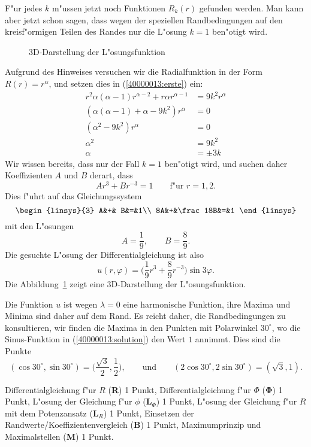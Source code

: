 \begin{loesung}
\begin{teilaufgaben}
F"ur jedes $k$ m"ussen jetzt noch Funktionen $R_k(r)$ gefunden werden.
Man kann aber jetzt schon sagen, dass wegen der speziellen Randbedingungen
auf den kreisf"ormigen Teilen des Randes nur die L"osung $k=1$ ben"otigt wird.

\begin{figure}
\centering
{}
\caption{3D-Darstellung der L"osungsfunktion
\label{40000013:3d}}
\end{figure}
Aufgrund des Hinweises versuchen wir die Radialfunktion in der Form
$R(r)=r^\alpha$, und setzen dies in (\ref{40000013:erste}) ein:
\begin{align*}
r^2\alpha(\alpha-1)r^{\alpha-2}+r\alpha r^{\alpha-1}&=9k^2r^{\alpha}
\\
(\alpha(\alpha-1)+\alpha -9k^2)r^{\alpha}&=0
\\
(\alpha^2 -9k^2)r^{\alpha}&=0
\\
\alpha^2&=9k^2
\\
\alpha&=\pm3k
\end{align*}
Wir wissen bereits, dass nur der Fall $k=1$ ben"otigt wird, und suchen
daher Koeffizienten $A$ und $B$ derart, dass
\[
Ar^3+Br^{-3}=1\qquad \text{f"ur $r=1,2$.}
\]
Dies f"uhrt auf das Gleichungssystem
\[
\begin{linsys}{3}
 A&+&       B&=&1\\
8A&+&\frac18B&=&1
\end{linsys}
\]
mit den L"osungen
\[
A=\frac19,\qquad B=\frac89.
\]
Die gesuchte L"osung der Differentialgleichung ist also
\begin{equation}
u(r,\varphi)=\biggl(\frac19r^3+\frac89r^{-3}\biggr)\sin 3\varphi.
\label{40000013:solution}
\end{equation}
Die Abbildung~\ref{40000013:3d} zeigt eine 3D-Darstellung der L"osungsfunktion.
\item
Die Funktion $u$ ist wegen $\lambda=0$ eine harmonische Funktion, ihre
Maxima und Minima sind daher auf dem Rand.
Es reicht daher, die Randbedingungen zu konsultieren, wir finden die
Maxima in den Punkten mit Polarwinkel $30^\circ$, wo die Sinus-Funktion
in (\ref{40000013:solution}) den Wert $1$ annimmt.
Dies sind die Punkte
\[
(\cos 30^\circ, \sin 30^\circ)=\biggl(
\frac{\sqrt{3}}{2}
,
\frac12
\biggr),\qquad
\text{und}\qquad
(
2\cos 30^\circ
,
2\sin 30^\circ
)=(
\sqrt{3}
,
1
).
\]
\end{teilaufgaben}
\end{loesung}

\begin{bewertung}
Differentialgleichung f"ur $R$ ({\bf R}) 1 Punkt,
Differentialgleichung f"ur $\Phi$ ({$\mathbf \Phi$}) 1 Punkt,
L"osung der Gleichung f"ur $\phi$ ($\textbf{L}_\Phi$) 1 Punkt,
L"osung der Gleichung f"ur $R$ mit dem Potenzansatz ($\textbf{L}_R$) 1 Punkt,
Einsetzen der Randwerte/Koeffizientenvergleich ({\bf B}) 1 Punkt,
Maximumprinzip und Maximalstellen ({\bf M}) 1 Punkt.
\end{bewertung}


